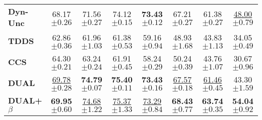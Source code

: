 \begin{table}[ht]
\begin{tabular}{lccccccc}
    \textbf{Dyn-Unc} & 68.17 \scriptsize{$\pm 0.26 $} & 71.56 \scriptsize{$\pm 0.27 $} & 74.12 \scriptsize{$\pm 0.15 $} & \textbf{73.43} \scriptsize{$\pm 0.12 $} & 67.21 \scriptsize{$\pm 0.27 $} & 61.38 \scriptsize{$\pm 0.27 $} & \underline{48.00} \scriptsize{$\pm 0.79 $} \\
    
    \textbf{TDDS} & 62.86 \scriptsize{$\pm 0.36 $} & 61.96 \scriptsize{$\pm 1.03 $} & 61.38 \scriptsize{$\pm 0.53 $} & 59.16 \scriptsize{$\pm 0.94 $} & 48.93 \scriptsize{$\pm 1.68 $} & 43.83  \scriptsize{$\pm 1.13 $} & 34.05 \scriptsize{$\pm 0.49 $} \\
    
    \textbf{CCS} & 64.30 \scriptsize{$\pm 0.21 $} & 63.24 \scriptsize{$\pm 0.24 $} & 61.91 \scriptsize{$\pm 0.45 $} & 58.24 \scriptsize{$\pm 0.29 $} & 50.24 \scriptsize{$\pm 0.39 $} & 43.76 \scriptsize{$\pm 1.07 $} & 30.67  \scriptsize{$\pm 0.96 $} \\
    
    \midrule
    
    \textbf{DUAL} & \underline{69.78} \scriptsize{$\pm 0.28 $} & \textbf{74.79} \scriptsize{$\pm 0.07 $} & \textbf{75.40} \scriptsize{$\pm 0.11 $} & \textbf{73.43} \scriptsize{$\pm 0.16 $} & \underline{67.57} \scriptsize{$\pm 0.18 $} & \underline{61.46} \scriptsize{$\pm 0.45 $} & 43.30 \scriptsize{$\pm 1.59 $} \\
    
    \textbf{DUAL+$\beta$} & \textbf{69.95} \scriptsize{$\pm 0.60 $} & \underline{74.68} \scriptsize{$\pm 1.22 $} & \underline{75.37} \scriptsize{$\pm 1.33 $} & \underline{73.29} \scriptsize{$\pm 0.84 $} & \textbf{68.43} \scriptsize{$\pm 0.77 $} & \textbf{63.74} \scriptsize{$\pm 0.35 $} & \textbf{54.04} \scriptsize{$\pm 0.92 $} \\
    
    \bottomrule
\end{tabular}
\end{table}





